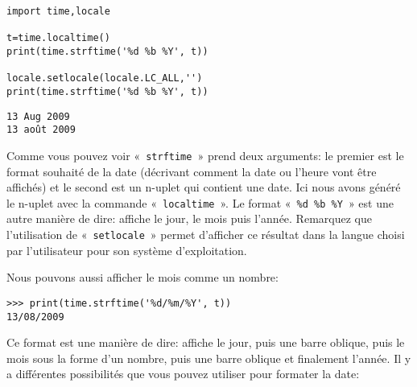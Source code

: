 \begin{Verbatim}[frame=single,rulecolor=\color{gray},label=code]
import time,locale

t=time.localtime()
print(time.strftime('%d %b %Y', t))

locale.setlocale(locale.LC_ALL,'')
print(time.strftime('%d %b %Y', t))
\end{Verbatim}


\begin{Verbatim}[frame=single,rulecolor=\color{gray},label=résultat]
13 Aug 2009
13 août 2009
\end{Verbatim}

Comme vous pouvez voir « \texttt{strftime} » prend deux arguments: le premier est le format souhaité de la date (décrivant comment la date ou l'heure vont être affichés) et le second est un n-uplet qui contient une date. Ici nous avons généré le n-uplet avec la commande « \texttt{localtime} ». Le format « \texttt{\%d \%b \%Y} » est une autre manière de dire: affiche le jour, le mois puis l'année. Remarquez que l'utilisation de « \texttt{setlocale} » permet d'afficher ce résultat dans la langue choisi par l'utilisateur pour son système d'exploitation.

Nous pouvons aussi afficher le mois comme un nombre:
\begin{Verbatim}[frame=single,rulecolor=\color{gray}]
>>> print(time.strftime('%d/%m/%Y', t))
13/08/2009
\end{Verbatim}

Ce format est une manière de dire: affiche le jour, puis une barre oblique, puis le mois sous la forme d'un nombre, puis une barre oblique et finalement l'année.
Il y a différentes possibilités que vous pouvez utiliser pour formater la date:


